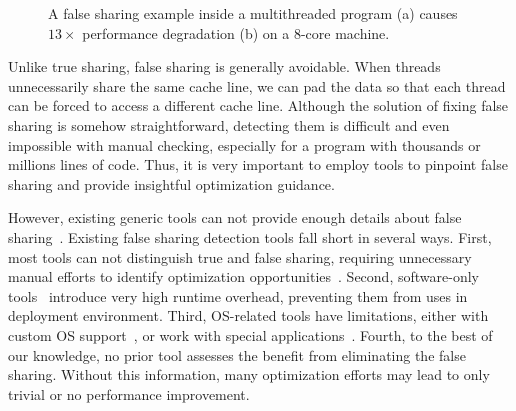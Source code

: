 \begin{figure}[htbp]
\centering
{}%
\hspace{20pt}
\caption{
A false sharing example inside a multithreaded program (a) causes $13\times$ performance degradation (b) on a 8-core machine.
\label{fig:penalty}}
\end{figure}


Unlike true sharing, false sharing is generally avoidable. When threads unnecessarily share the same cache line, we can pad the data so that each thread can be forced to access a different cache line. Although the solution of fixing false sharing is somehow straightforward, detecting them is difficult and even impossible with manual checking, especially for a program with thousands or millions lines of code. Thus, it is very important to employ tools to pinpoint false sharing and provide insightful optimization guidance.

However, existing generic tools can not provide enough details about false sharing~\cite{gprof, ibs-sc, Intel:VTune}. Existing false sharing detection tools fall short in several ways. First, most tools can not distinguish true and false sharing, requiring unnecessary manual efforts to identify optimization opportunities~\cite{falseshare:binaryinstrumentation1,detect:ptu,detect:intel,falseshare:binaryinstrumentation2,DProf, qinzhao, OSdetection, mldetect, Wicaksono11detectingfalse, openmp}. Second, software-only tools~\cite{falseshare:binaryinstrumentation1,falseshare:binaryinstrumentation2,falseshare:simulator, Predator} introduce very high runtime overhead, preventing them from uses in deployment environment. Third, OS-related tools have limitations, either with custom OS support~\cite{OSdetection}, or work with special applications~\cite{Sheriff}. Fourth, to the best of our knowledge, no prior tool assesses the benefit from eliminating the false sharing. Without this information, many optimization efforts may lead to only trivial or no performance improvement.

